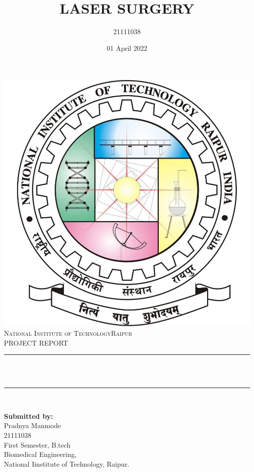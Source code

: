 \documentclass[12pt]{article}
\title{LASER SURGERY}
\author{21111038}
\date{01 April 2022}											%
\makeatletter
\let\thetitle\@title
\makeatother
\begin{document}

\begin{titlepage}
	\centering
    \vspace*{0.5 cm}
    \includegraphics[scale = 0.17]{logo.jpg}\\[1.0 cm]
    \textsc{\LARGE  National Institute of Technology\newline\newline Raipur}\\[2.0 cm]	
	\textsc{\Large PROJECT REPORT }\\[0.5 cm]			
	\rule{\linewidth}{0.2 mm} \\[0.4 cm]
	{ \huge \bfseries \thetitle}\\
	\rule{\linewidth}{0.2 mm} \\[1.5 cm]
	
\begin{minipage}{0.4\textwidth}
	\begin{flushleft} \large
		{\textbf{Submitted by:}}\\
		Pradnya Manmode\\
        21111038\\
        First Semester, B.tech\\
        Biomedical Engineering,\\
        National Iinstitute of Technology, Raipur.\\
			\end{flushleft}
			\end{minipage}~
			\begin{minipage}{0.4\textwidth}
            
	\end{minipage}\\[2 cm]
	
	
    
    
    
    
	
\end{titlepage}
\end{document}
